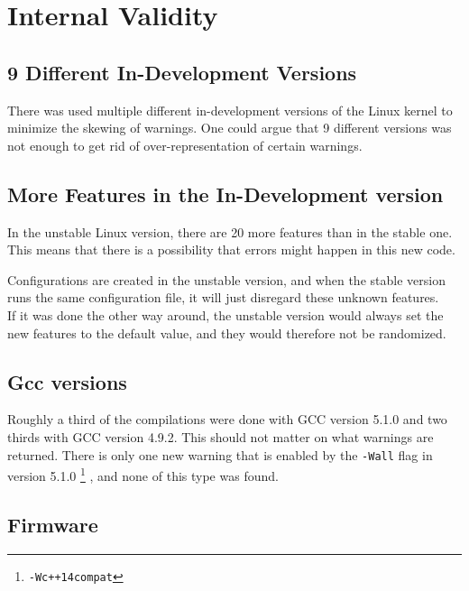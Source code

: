 \documentclass[a4paper,11pt]{report}
\begin{document}
            \section{Internal Validity}
            \label{sec:intval}


            \subsection{9 Different In-Development Versions}
There was used multiple different in-development versions of the Linux kernel to 
minimize the skewing of warnings. One could argue that 9 different versions was 
not enough to get rid of over-representation of certain warnings.


            \subsection{More Features in the In-Development version}
In the unstable Linux version, there are 20 more features than in the stable 
one. This means that there is a possibility that errors might happen in this 
new code.

Configurations are created in the unstable version, and when the stable version 
runs the same configuration file, it will just disregard these unknown features.
\\

If it was done the other way around, the unstable version would always set the 
new features to the default value, and they would therefore not be randomized.


            \subsection{Gcc versions}
Roughly a third of the compilations were done with GCC version 5.1.0 and two 
thirds with GCC version 4.9.2. This should not matter on what warnings are 
returned. There is only one new warning that is enabled by the \texttt{-Wall} 
flag in version 5.1.0
    \footnote{\texttt{-Wc++14compat}}
, and none of this type was found.



\subsection{Firmware}
\end{document}
